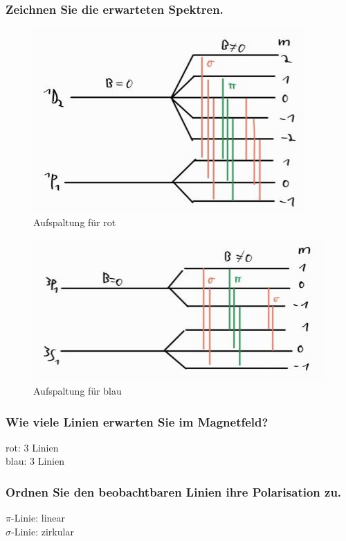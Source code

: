 \subsubsection{Zeichnen Sie die erwarteten Spektren.}
\begin{figure}[H] 
    \centering
    \includegraphics[scale=0.7]{pictures/Aufspaltung_rot.png}
    \caption{Aufspaltung für rot}
\end{figure}
\begin{figure}[H] 
    \centering
    \includegraphics[scale=0.7]{pictures/Aufspaltung_blau.png}
    \caption{Aufspaltung für blau}
\end{figure}

\subsubsection{Wie viele Linien erwarten Sie im Magnetfeld?}
rot: 3 Linien\\\noindent
blau: 3 Linien

\subsubsection{Ordnen Sie den beobachtbaren Linien ihre Polarisation zu.}
$\pi$-Linie: linear\\\noindent
$\sigma$-Linie: zirkular



